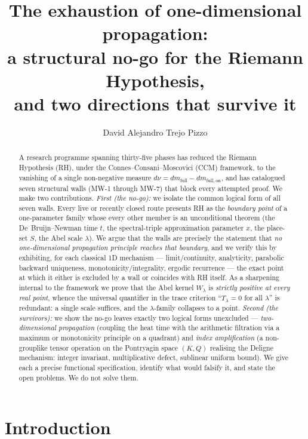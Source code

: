 \documentclass[11pt]{amsart}
\title[Exhaustion of 1-D Propagation]{The exhaustion of one-dimensional propagation:\\
a structural no-go for the Riemann Hypothesis,\\
and two directions that survive it}
\author{David Alejandro Trejo Pizzo}
\theoremstyle{definition}
\theoremstyle{remark}
\newcommand{\dmfull}{dm_{\mathrm{full}}}
\newcommand{\dmon}{dm_{\mathrm{full,on}}}
\newcommand{\Wl}{W_\lambda}
\newcommand{\Tl}{T_\lambda}
\begin{document}
\nocite{bgConnes99,bgDeninger}

\begin{abstract}
A research programme spanning thirty-five phases has reduced the Riemann
Hypothesis (RH), under the Connes--Consani--Moscovici (CCM) framework, to
the vanishing of a single non-negative measure $d\nu=\dmfull-\dmon$, and
has catalogued seven structural walls (MW-1 through MW-7) that block every
attempted proof. We make two contributions. \emph{First (the no-go):} we
isolate the common logical form of all seven walls. Every live or recently
closed route presents RH as the \emph{boundary point} of a one-parameter
family whose every other member is an unconditional theorem (the
De~Bruijn--Newman time $t$, the spectral-triple approximation parameter
$x$, the place-set $S$, the Abel scale $\lambda$). We argue that the walls
are precisely the statement that \emph{no one-dimensional propagation
principle reaches that boundary}, and we verify this by exhibiting, for
each classical 1D mechanism --- limit/continuity, analyticity, parabolic
backward uniqueness, monotonicity/integrality, ergodic recurrence --- the
exact point at which it either is excluded by a wall or coincides with RH
itself. As a sharpening internal to the framework we prove that the Abel
kernel $\Wl$ is \emph{strictly positive at every real point}, whence the
universal quantifier in the trace criterion ``$\Tl=0$ for all $\lambda$''
is redundant: a single scale suffices, and the $\lambda$-family collapses
to a point. \emph{Second (the survivors):} we show the no-go leaves
exactly two logical forms unexcluded --- \emph{two-dimensional propagation}
(coupling the heat time with the arithmetic filtration via a maximum or
monotonicity principle on a quadrant) and \emph{index amplification} (a
non-grouplike tensor operation on the Pontryagin space $(K,Q)$ realising
the Deligne mechanism: integer invariant, multiplicative defect,
sublinear uniform bound). We give each a precise functional specification,
identify what would falsify it, and state the open problems. We do not
solve them.
\end{abstract}

\maketitle
\tableofcontents
\newpage

\section{Introduction}
\end{document}
